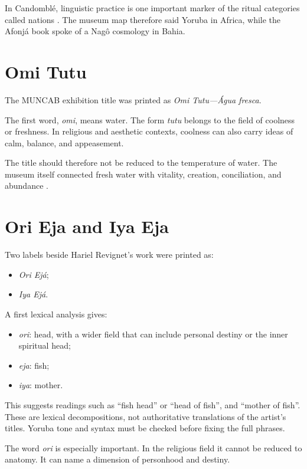 In Candombl\'e, linguistic practice is one
important marker of the ritual categories
called nations \cite{castro1981lingua}.
The museum map therefore said Yoruba in
Africa, while the Afonj\'a book spoke of a
Nag\^o cosmology in Bahia.

\section{Omi Tutu}
\label{section-languages-omi-tutu}

The MUNCAB exhibition title was printed as
\emph{Omi Tutu---\'Agua fresca}.

The first word, \emph{omi}, means water.
The form \emph{tutu} belongs to the field
of coolness or freshness.  In religious
and aesthetic contexts, coolness can also
carry ideas of calm, balance, and
appeasement.

The title should therefore not be reduced
to the temperature of water.  The museum
itself connected fresh water with vitality,
creation, conciliation, and abundance
\cite{muncab2026omitutu}.

\section{Ori Eja and Iya Eja}
\label{section-languages-ori-iya-eja}

Two labels beside Hariel Revignet's work
were printed as:

\begin{itemize}
\item \emph{Ori Ej\'a};
\item \emph{Iya Ej\'a}.
\end{itemize}

A first lexical analysis gives:

\begin{itemize}
\item \emph{ori}: head, with a wider field
that can include personal destiny or the
inner spiritual head;
\item \emph{eja}: fish;
\item \emph{iya}: mother.
\end{itemize}

This suggests readings such as ``fish
head'' or ``head of fish'', and ``mother of
fish''.  These are lexical decompositions,
not authoritative translations of the
artist's titles.  Yoruba tone and syntax
must be checked before fixing the full
phrases.

The word \emph{ori} is especially
important.  In the religious field it
cannot be reduced to anatomy.  It can name
a dimension of personhood and destiny.

